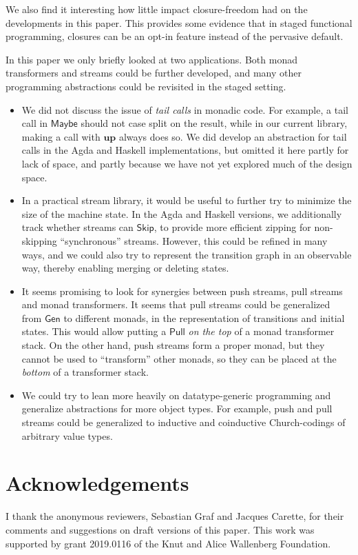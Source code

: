 \documentclass[acmsmall]{acmart}
\newcommand{\msf}[1]{{\mathsf{#1}}}
\newcommand{\mbf}[1]{{\mathbf{#1}}}
\newcommand{\Maybe}{\msf{Maybe}}
\theoremstyle{remark}
\newcommand{\mup}{\mbf{up}}
\newcommand{\Gen}{\msf{Gen}}
\newcommand{\Skip}{\msf{Skip}}
\newcommand{\Pull}{\msf{Pull}}
\begin{document}
We also find it interesting how little impact closure-freedom had on the
developments in this paper. This provides some evidence that in staged
functional programming, closures can be an opt-in feature instead of the
pervasive default.

In this paper we only briefly looked at two applications. Both monad
transformers and streams could be further developed, and many other programming
abstractions could be revisited in the staged setting.
\begin{itemize}
\item
     We did not discuss the issue of \emph{tail calls} in monadic code. For
     example, a tail call in $\Maybe$ should not case split on the result, while
     in our current library, making a call with $\mup$ always does so. We did
     develop an abstraction for tail calls in the Agda and Haskell
     implementations, but omitted it here partly for lack of space, and partly
     because we have not yet explored much of the design space.

\item In a practical stream library, it would be useful to further try to
     minimize the size of the machine state. In the Agda and Haskell versions, we
     additionally track whether streams can $\Skip$, to provide more efficient
     zipping for non-skipping ``synchronous'' streams. However, this could be
     refined in many ways, and we could also try to represent the transition
     graph in an observable way, thereby enabling merging or deleting states.

\item It seems promising to look for synergies between push streams, pull streams
     and monad transformers. It seems that pull streams could be generalized from
     $\Gen$ to different monads, in the representation of transitions and initial
     states. This would allow putting a $\Pull$ \emph{on the top} of a monad
     transformer stack. On the other hand, push streams form a proper monad, but
     they cannot be used to ``transform'' other monads, so they can be placed
     at the \emph{bottom} of a transformer stack.
\item We could try to lean more heavily on datatype-generic programming and
     generalize abstractions for more object types. For example, push and pull
     streams could be generalized to inductive and coinductive Church-codings of
     arbitrary value types.
\end{itemize}

\section*{Acknowledgements}
I thank the anonymous reviewers, Sebastian Graf and Jacques Carette, for their
comments and suggestions on draft versions of this paper. This work was supported
by grant 2019.0116 of the Knut and Alice Wallenberg Foundation.
\end{document}
